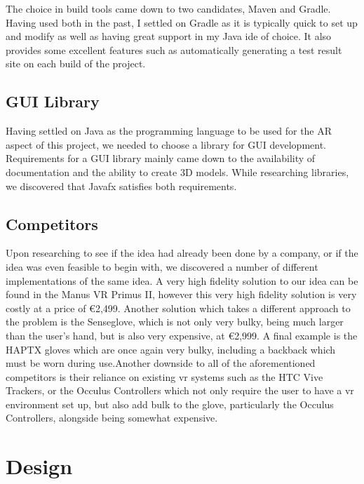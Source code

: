 \documentclass[12pt,a4paper,oneside]{book}
\theoremstyle{plain}
\numberwithin{equation}{chapter}
\newcounter{Chapnum}
\newcounter{Secnum}
\begin{document}
\noindent The choice in build tools came down to two candidates, Maven and Gradle. Having used both in the past, I settled on Gradle as it is typically quick to set up and modify as well as having great support in my Java ide of choice. It also provides some excellent features such as automatically generating a test result site on each build of the project.

\section{GUI Library}

\noindent Having settled on Java as the programming language to be used for the AR aspect of this project, we needed to choose a library for GUI development. Requirements for a GUI library mainly came down to the availability of documentation and the ability to create 3D models. While researching libraries, we discovered that Javafx satisfies both requirements.

\section{\textbf{Competitors}}

\noindent Upon researching to see if the idea had already been done by a company, or if the idea was even feasible to begin with, we discovered a number of different implementations of the same idea. A very high fidelity solution to our idea can be found in the Manus VR Primus II, however this very high fidelity solution is very costly at a price of €2,499.  Another solution which takes a different approach to the problem is the Senseglove, which is not only very bulky, being much larger than the user's hand, but is also very expensive, at €2,999. A final example is the HAPTX gloves which are once again very bulky, including a backback which must be worn during use.Another downside to all of the aforementioned competitors is their reliance on existing vr systems such as the HTC Vive Trackers, or the Occulus Controllers which not only require the user to have a vr environment set up, but also add bulk to the glove, particularly the Occulus Controllers, alongside being somewhat expensive.

\chapter*{\textbf{Design}}
\end{document}
